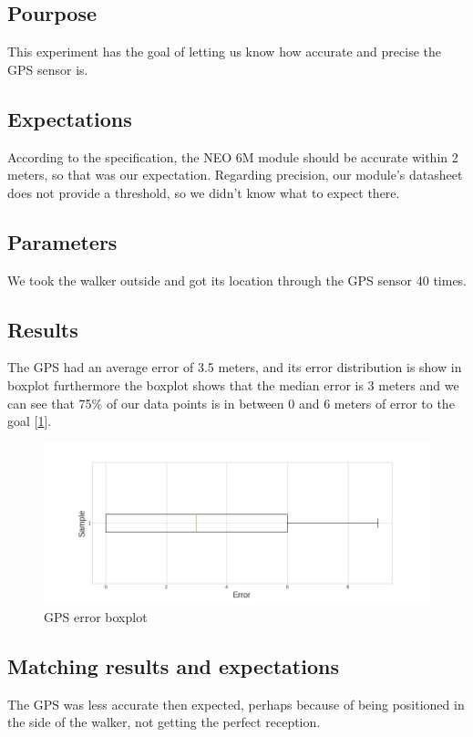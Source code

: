 	\subsection*{Pourpose}
		This experiment has the goal of letting us know how accurate and precise the GPS sensor is.

	\subsection*{Expectations}
		According to the specification, the NEO 6M module should be accurate within 2 meters, so that was our expectation. Regarding precision, our module's datasheet does not provide a threshold, so we didn't know what to expect there.

	\subsection*{Parameters}
		We took the walker outside and got its location through the GPS sensor 40 times.

	\subsection*{Results}
		The GPS had an average error of 3.5 meters, and its error distribution is show in boxplot furthermore the boxplot shows that the median error is 3 meters and  we can see that 75\% of our data points is in between $0$ and 6 meters of error to the goal [\ref{fig:gps_plot}].

		\begin{figure}[h!]
			\centering
			\includegraphics[width=1.1\linewidth]{gfx/gps_boxplot_error}
			\caption{GPS error boxplot}
			\label{fig:gps_plot}
		\end{figure}

	\subsection*{Matching results and expectations}
		The GPS was less accurate then expected, perhaps because of being positioned in the side of the walker, not getting the perfect reception.

